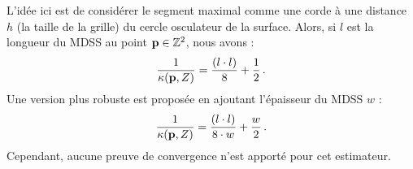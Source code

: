 L'idée ici est de considérer le segment maximal comme une corde à une distance
$h$ (la taille de la grille) du cercle osculateur de la surface.
Alors, si $l$ est la longueur du MDSS au point $\mathbf{p} \in \mathbb{Z}^2$, nous avons :
%
\begin{equation}
    \frac{1}{\kappa(\mathbf{p},Z)} = \frac{(l \cdot l)}{8} + \frac{1}{2} \,.
\end{equation}
%
Une version plus robuste est proposée en ajoutant l'épaisseur du MDSS $w$ :
%
\begin{equation}
    \frac{1}{\kappa(\mathbf{p},Z)} = \frac{(l \cdot l)}{8 \cdot w} + \frac{w}{2} \,.
\end{equation}
%
Cependant, aucune preuve de convergence n'est apporté pour cet estimateur.
%
%



